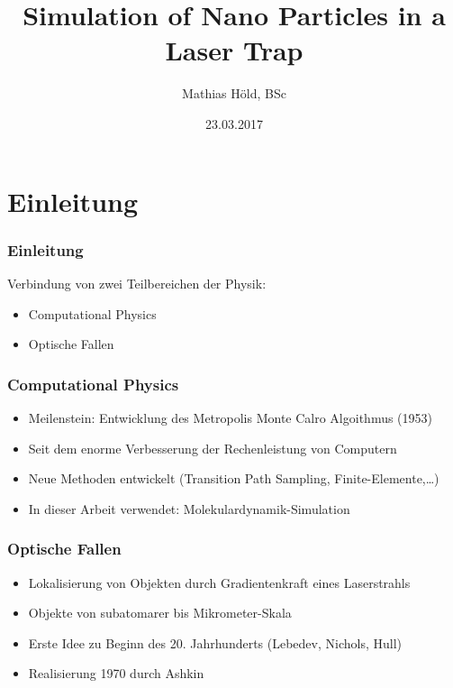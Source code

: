 \documentclass[handout]{beamer}
\begin{document}
\title{Simulation of Nano Particles in a Laser Trap}
\author{Mathias Höld, BSc}
\date{23.03.2017}
\begin{frame}
\titlepage
\end{frame}

\begin{frame}
\tableofcontents
\end{frame}

\section{Einleitung}
\begin{frame}
\frametitle{Einleitung}
Verbindung von zwei Teilbereichen der Physik:
\begin{itemize}
\item Computational Physics
\item Optische Fallen
\end{itemize}
\end{frame}

\begin{frame}
\frametitle{Computational Physics}
\begin{itemize}
\item Meilenstein: Entwicklung des Metropolis Monte Calro Algoithmus (1953)
\item Seit dem enorme Verbesserung der Rechenleistung von Computern 
\item Neue Methoden entwickelt (Transition Path Sampling, Finite-Elemente,\ldots)
\item In dieser Arbeit verwendet: Molekulardynamik-Simulation
\end{itemize}
\end{frame}

\begin{frame}
\frametitle{Optische Fallen}
\begin{itemize}
\item Lokalisierung von Objekten durch Gradientenkraft eines Laserstrahls
\item Objekte von subatomarer bis Mikrometer-Skala
\item Erste Idee zu Beginn des 20. Jahrhunderts (Lebedev, Nichols, Hull)
\item Realisierung 1970 durch Ashkin
\end{itemize}
\end{frame}
\end{document}
